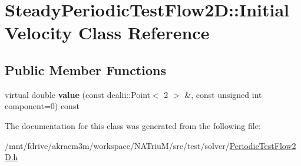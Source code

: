 \hypertarget{classSteadyPeriodicTestFlow2D_1_1InitialVelocity}{
\section{SteadyPeriodicTestFlow2D::InitialVelocity Class Reference}
\label{classSteadyPeriodicTestFlow2D_1_1InitialVelocity}
}
\subsection*{Public Member Functions}
\begin{DoxyCompactItemize}
\item 
\hypertarget{classSteadyPeriodicTestFlow2D_1_1InitialVelocity_ae054ff3827163ebd18adc6ac0d11cbd1}{
virtual double {\bfseries value} (const dealii::Point$<$ 2 $>$ \&, const unsigned int component=0) const }
\label{classSteadyPeriodicTestFlow2D_1_1InitialVelocity_ae054ff3827163ebd18adc6ac0d11cbd1}

\end{DoxyCompactItemize}


The documentation for this class was generated from the following file:\begin{DoxyCompactItemize}
\item 
/mnt/fdrive/akraem3m/workspace/NATriuM/src/test/solver/\hyperlink{PeriodicTestFlow2D_8h}{PeriodicTestFlow2D.h}\end{DoxyCompactItemize}
